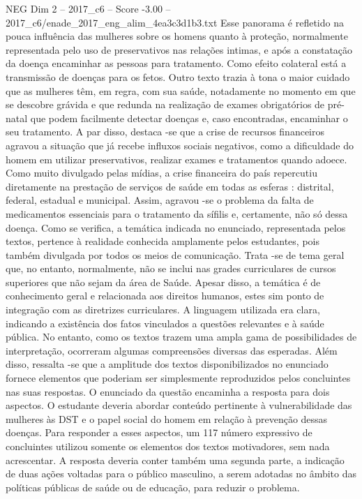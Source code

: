 \begin{textsample}{NEG Dim 2 – 2017\_c6 – Score -3.00 – 2017\_c6/enade\_2017\_eng\_alim\_4ea3c3d1b3.txt}
Esse panorama é refletido na pouca influência das mulheres sobre os homens quanto à proteção, normalmente representada pelo uso de preservativos nas relações intimas, e após a constatação da doença encaminhar as pessoas para tratamento.
Como efeito colateral está a transmissão de doenças para os fetos.
Outro texto trazia à tona o maior cuidado que as mulheres têm, em regra, com sua saúde, notadamente no momento em que se descobre grávida e que redunda na realização de exames obrigatórios de pré-natal que podem facilmente detectar doenças e, caso encontradas, encaminhar o seu tratamento.
A par disso, destaca -se que a crise de recursos financeiros agravou a situação que já recebe influxos sociais negativos, como a dificuldade do homem em utilizar preservativos, realizar exames e tratamentos quando adoece.
Como muito divulgado pelas mídias, a crise financeira do país repercutiu diretamente na prestação de serviços de saúde em todas as esferas : distrital, federal, estadual e municipal.
Assim, agravou -se o problema da falta de medicamentos essenciais para o tratamento da sífilis e, certamente, não só dessa doença.
Como se verifica, a temática indicada no enunciado, representada pelos textos, pertence à realidade conhecida amplamente pelos estudantes, pois também divulgada por todos os meios de comunicação.
Trata -se de tema geral que, no entanto, normalmente, não se inclui nas grades curriculares de cursos superiores que não sejam da área de Saúde.
Apesar disso, a temática é de conhecimento geral e relacionada aos direitos humanos, estes sim ponto de integração com as diretrizes curriculares.
A linguagem utilizada era clara, indicando a existência dos fatos vinculados a questões relevantes e à saúde pública.
No entanto, como os textos trazem uma ampla gama de possibilidades de interpretação, ocorreram algumas compreensões diversas das esperadas.
Além disso, ressalta -se que a amplitude dos textos disponibilizados no enunciado fornece elementos que poderiam ser simplesmente reproduzidos pelos concluintes nas suas respostas.
O enunciado da questão encaminha a resposta para dois aspectos.
O estudante deveria abordar conteúdo pertinente à vulnerabilidade das mulheres às DST e o papel social do homem em relação à prevenção dessas doenças.
Para responder a esses aspectos, um 117 número expressivo de concluintes utilizou somente os elementos dos textos motivadores, sem nada acrescentar.
A resposta deveria conter também uma segunda parte, a indicação de duas ações voltadas para o público masculino, a serem adotadas no âmbito das políticas públicas de saúde ou de educação, para reduzir o problema.

\end{textsample}
